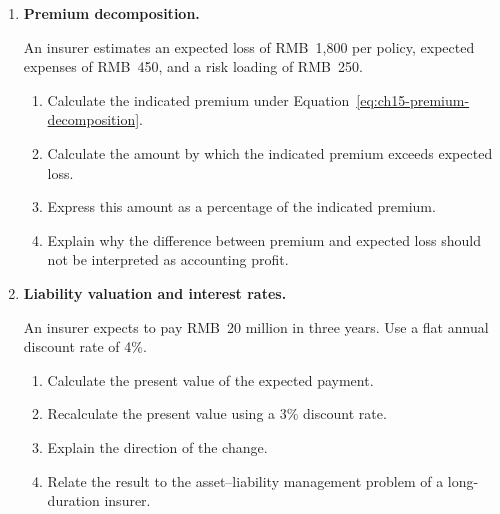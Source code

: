 \begin{enumerate}
\begin{enumerate}
\item Calculate the insured's retained loss in each case.

\item Explain how the deductible affects policyholder incentives relative to full reimbursement from the first RMB of loss.

\end{enumerate}

\item \textbf{Premium decomposition.}

An insurer estimates an expected loss of RMB~1,800 per policy, expected expenses of RMB~450, and a risk loading of RMB~250.

\begin{enumerate}

\item Calculate the indicated premium under Equation~\ref{eq:ch15-premium-decomposition}.

\item Calculate the amount by which the indicated premium exceeds expected loss.

\item Express this amount as a percentage of the indicated premium.

\item Explain why the difference between premium and expected loss should not be interpreted as accounting profit.

\end{enumerate}

\item \textbf{Liability valuation and interest rates.}

An insurer expects to pay RMB~20 million in three years. Use a flat annual discount rate of 4\%.

\begin{enumerate}

\item Calculate the present value of the expected payment.

\item Recalculate the present value using a 3\% discount rate.

\item Explain the direction of the change.

\item Relate the result to the asset--liability management problem of a long-duration insurer.

\end{enumerate}


\end{enumerate}

